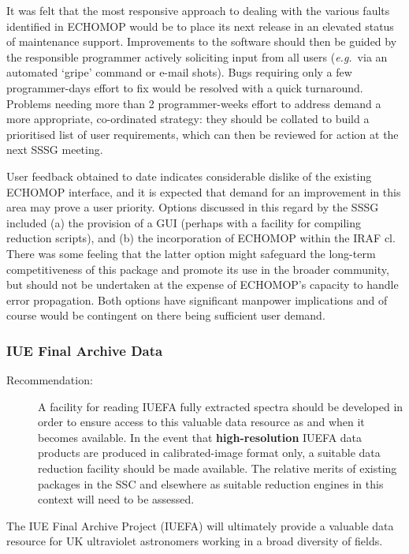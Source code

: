 It was felt that the most responsive approach to dealing with the
various faults identified in ECHOMOP would be to place its next
release in an elevated status of maintenance support.  Improvements to
the software should then be guided by the responsible programmer
actively soliciting input from all users ({\em e.g.}\ via an automated
`gripe' command or e-mail shots).  Bugs requiring only a few
programmer-days effort to fix would be resolved with a quick
turnaround.  Problems needing more than 2 programmer-weeks effort to
address demand a more appropriate, co-ordinated strategy: they should
be collated to build a prioritised list of user requirements, which
can then be reviewed for action at the next SSSG meeting.

User feedback obtained to date indicates considerable dislike of the existing
ECHOMOP interface, and it is expected that demand for an improvement
in this area may prove a user priority.  Options discussed in this
regard by the SSSG included (a) the provision of a GUI (perhaps with a
facility for compiling reduction scripts), and (b) the incorporation
of ECHOMOP within the IRAF cl.  There was some feeling that the latter
option might safeguard the long-term competitiveness of this package
and promote its use in the broader community, but should not be
undertaken at the expense of ECHOMOP's capacity to handle error
propagation. Both options have significant manpower implications and
of course would be contingent on there being sufficient user demand.

\subsubsection{IUE Final Archive Data}

\begin{description}
\item[Recommendation:]
A facility for reading IUEFA fully extracted spectra should be
developed in order to ensure access to this valuable data resource as
and when it becomes available. In the event that {\bf high-resolution}
IUEFA data products are produced in calibrated-image format only, a
suitable data reduction facility should be made available. The
relative merits of existing packages in the SSC and elsewhere as
suitable reduction engines in this context will need to be assessed.
\end{description}

The IUE Final Archive Project (IUEFA) will ultimately provide a
valuable data resource for UK ultraviolet astronomers working in a
broad diversity of fields.

